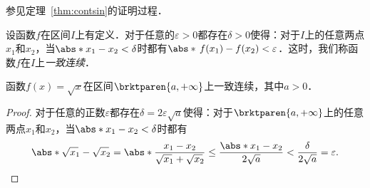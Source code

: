 \begin{example*}
  参见定理~\ref{thm:contsin}的证明过程．
\end{example*}

\begin{definition}[一致连续]
  \label{defn:unicont}
  设函数\(f\)在区间\(I\)上有定义．对于任意的\(\varepsilon > 0\)都存在\(\delta > 0\)使得：对于\(I\)上的任意两点\(x_1\)和\(x_2\)，当\(\abs*{x_1 - x_2} < \delta\)时都有\(\abs*{\,f(x_1) - f(x_2)} < \varepsilon\)．这时，我们称函数\(f\)在\(I\)上\emph{一致连续}．
\end{definition}

\begin{example*}
  函数\(f(x) = \sqrt x\)在区间\(\brktparen{a,+\infty}\)上一致连续，其中\(a > 0\)．

  \begin{proof}
    对于任意的正数\(\varepsilon\)都存在\(\delta = 2 \varepsilon \sqrt a\)使得：对于\(\brktparen{a,+\infty}\)上的任意两点\(x_1\)和\(x_2\)，当\(\abs*{x_1 - x_2} < \delta\)时都有
    \begin{equation*}
      \abs*{\sqrt{\smash[b]{x_1}\!}\, - \sqrt{\smash[b]{x_2}\!}\,}
      = \abs*{\frac{x_1 - x_2}{\sqrt{\smash[b]{x_1}\!}\, + \sqrt{\smash[b]{x_2}\!}\,}}
      \le \frac{\abs*{x_1 - x_2}}{2 \sqrt a}
      < \frac{\delta}{2 \sqrt a}
      = \varepsilon.
      \qedhere
    \end{equation*}
  \end{proof}
\end{example*}


